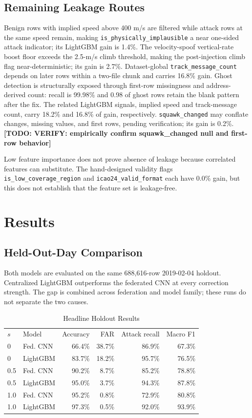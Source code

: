 \documentclass[conference]{IEEEtran}
\newcommand{\todo}[1]{\textbf{[TODO: #1]}}
\begin{document}
\subsection{Remaining Leakage Routes}
Benign rows with implied speed above 400 m/s are filtered while attack rows at the same speed remain, making \texttt{is\_physically\_implausible} a near one-sided attack indicator; its LightGBM gain is 1.4\%. The velocity-spoof vertical-rate boost floor exceeds the 2.5-m/s climb threshold, making the post-injection climb flag near-deterministic; its gain is 2.7\%. Dataset-global \texttt{track\_message\_count} depends on later rows within a two-file chunk and carries 16.8\% gain. Ghost detection is structurally exposed through first-row missingness and address-derived count: recall is 99.98\% and 0.98 of ghost rows retain the blank pattern after the fix. The related LightGBM signals, implied speed and track-message count, carry 18.2\% and 16.8\% of gain, respectively. \texttt{squawk\_changed} may conflate changes, missing values, and first rows, pending verification; its gain is 0.2\%. \todo{VERIFY: empirically confirm squawk\_changed null and first-row behavior}

Low feature importance does not prove absence of leakage because correlated features can substitute. The hand-designed validity flags \texttt{is\_low\_coverage\_region} and \texttt{icao24\_valid\_format} each have 0.0\% gain, but this does not establish that the feature set is leakage-free.

\section{Results}
\subsection{Held-Out-Day Comparison}
Both models are evaluated on the same 688,616-row 2019-02-04 holdout. Centralized LightGBM outperforms the federated CNN at every correction strength. The gap is combined across federation and model family; these runs do not separate the two causes. \cite{ke2017}
\begin{table}[t]\caption{Headline Holdout Results}\label{tab:headline}\centering\footnotesize
\begin{tabular}{llrrrr}\toprule $s$ & Model & Accuracy & FAR & Attack recall & Macro F1 \\
0 & Fed. CNN & 66.4\% & 38.7\% & 86.9\% & 67.3\% \\
0 & LightGBM & 83.7\% & 18.2\% & 95.7\% & 76.5\% \\
0.5 & Fed. CNN & 90.2\% & 8.7\% & 85.2\% & 78.8\% \\
0.5 & LightGBM & 95.0\% & 3.7\% & 94.3\% & 87.8\% \\
1.0 & Fed. CNN & 95.2\% & 0.8\% & 72.9\% & 80.8\% \\
1.0 & LightGBM & 97.3\% & 0.5\% & 92.0\% & 93.9\% \\
\bottomrule\end{tabular}\end{table}
\end{document}
